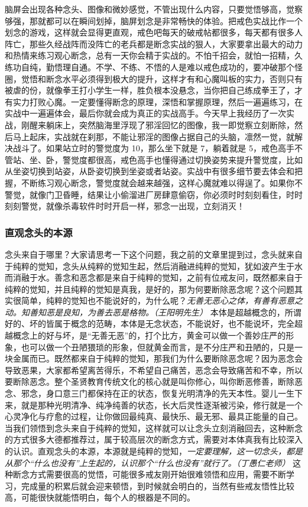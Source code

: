 脑屏会出现各种念头、图像和微妙感觉，不管出现什么内容，只要觉悟够高，觉察够强，那就都可以在瞬间划掉，脑屏划念是非常畅快的体验。把戒色实战比作一个划念的游戏，这样就会显得更直观，戒色吧每天的破戒帖都很多，每天都有很多人阵亡，那些久经战阵而没阵亡的老兵都是断念实战的狠人，大家要拿出最大的动力和热情来练习观心断念，总有一天你会精于实战的。不怕千招会，就怕一招精，久练功自纯，勤悟理自通。不学、不练、不悟的人是难以戒色成功的，要冲破那个怪圈，觉悟和断念水平必须得到极大的提升，这样才有和心魔叫板的实力，否则只有被虐的份，就像拳王打小学生一样，胜负根本没悬念，当你把自己练成拳王了，才有实力打败心魔。一定要懂得断念的原理，深悟和掌握原理，然后一遍遍练习，在实战中一遍遍体会，最后你就会成为真正的实战高手。今天早上我经历了一次实战，刚醒来躺床上，突然脑海里浮现了邪淫回忆的图像，我一即觉察立刻断除，然后马上起床，实战就在刹那，不能让邪淫的图像占据自己的头脑，凛然一觉，就解决战斗了。如果站立时的警觉度为 10，那么坐下就是 7，躺着就是 5，戒色高手不管站、坐、卧，警觉度都很高，戒色高手也懂得通过切换姿势来提升警觉度，比如从坐姿切换到站姿，从卧姿切换到坐姿或者站姿。实战中有很多细节要去体会和把握，不断练习观心断念，警觉度就会越来越强，这样心魔就难以得逞了。如果你不警觉，就像门卫昏睡，结果让小偷溜进厂房肆意偷窃，你必须时时刻刻看住，时时刻刻警觉，就像杀毒软件时时开启一样，邪念一出现，立刻消灭！

\subsubsection{直观念头的本源}

念头来自于哪里？大家请思考一下这个问题，我之前的文章里提到过，念头就来自于纯粹的觉知，念头从纯粹的觉知生起，然后消融进纯粹的觉知，犹如波产生于水而消融于水。善念和恶念都是来自于纯粹的觉知，之前有位戒友问，既然都来自于纯粹的觉知，并且纯粹的觉知是真我，是好的，那为何要断除恶念呢？这个问题其实很简单，纯粹的觉知也不能说好的，为什么呢？\textit{无善无恶心之体，有善有恶意之动。知善知恶是良知，为善去恶是格物。（王阳明先生）} 本体是超越概念的，所谓好的、坏的皆属于概念的范畴，本体是无念状态，不能说好，也不能说坏，完全超越概念上的好与坏，是“无善无恶”的，打个比方，黄金可以做一个善妙庄严的形象，也可以做一个丑陋猥琐的形象，但就黄金而言，是不分庄严和丑陋的，只是一块金属而已。既然都来自于纯粹的觉知，那我们为什么要断除恶念呢？因为恶念会导致恶果，大家都希望离苦得乐，不希望自己痛苦，恶念会导致痛苦和不幸，所以要断除恶念。整个圣贤教育传统文化的核心就是叫你修心，叫你断恶修善，断除恶念、邪念，身口意三门都保持在正的状态，恢复光明清净的先天本性。婴儿一生下来，就是那种光明清净、纯净纯善的状态，长大后灵性逐渐被污染，修行就是一个心灵净化与疗愈的过程，让你做回最纯真、最快乐、最无邪、最具正能量的自己。当我们领悟到念头来自于纯粹的觉知，这样就可以让念头立刻消融回去，这种断念的方式很多大德都推荐过，属于较高层次的断念方式，需要对本体真我有比较深入的认识。直观念头的本源，本源就是纯粹的觉知，\textit{一定要理解，这一切念头，都是从那个“什么也没有”上生起的，认识那个“什么也没有”就行了。（丁愚仁老师）} 这种断念方式需要很高的觉悟，可能很多戒友刚开始很难领悟和应用，需要不断学习，完成量的积累后就会迎来顿悟，到时候就会明白的，当然有些戒友悟性比较高，可能很快就能悟明白，每个人的根器是不同的。

